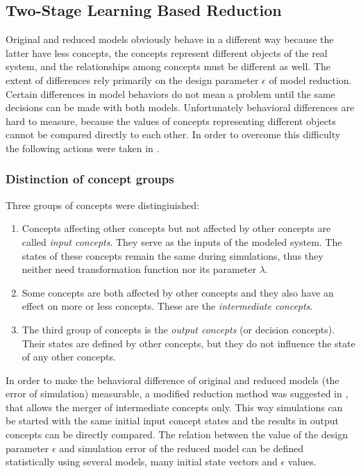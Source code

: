 \documentclass[graybox]{svmult}
\begin{document}
\subsection{Two-Stage Learning Based Reduction}
\label{sec:2stage}

Original and reduced models obviously behave in a different way 
because the latter have less concepts, the concepts 
represent different objects of the real system, and the 
relationships among concepts must be different as well. The extent 
of differences rely primarily on the design parameter $\epsilon$ of 
model reduction. Certain differences in model behaviors do not mean 
a problem until the same decisions can be made with both models. 
Unfortunately behavioral differences are hard to measure, because 
the values of concepts representing different objects cannot be 
compared directly to each other. In order to overcome this difficulty the 
following actions were taken in \cite{hatwagner2018two}.

\subsubsection{Distinction of concept groups}
\label{sec:conceptGroups}

Three groups of concepts were distingiuished: 
\begin{enumerate}
  \item Concepts affecting other concepts but not affected by other 
  concepts are called \emph{input concepts}. They serve as the inputs 
  of the modeled system. The states of these concepts remain the same 
  during simulations, thus they neither need transformation function 
  nor its parameter $\lambda$.
  \item Some concepts are both affected by other concepts and they 
  also have an effect on more or less concepts. These are the 
  \emph{intermediate concepts}.
  \item The third group of concepts is the \emph{output 
  concepts} (or decision concepts). Their states are defined by 
  other concepts, but they do not influence the state of any other 
  concepts. 
\end{enumerate} 
In order to make the behavioral difference of original and reduced 
models (the error of simulation) measurable, a modified reduction 
method was suggested in \cite{hatwagner2018two}, that allows the merger 
of intermediate concepts only. This way simulations can be started with 
the same initial input concept states and the results in output 
concepts can be directly compared. The relation between the value of 
the design parameter $\epsilon$ and simulation error of the reduced model 
can be defined statistically using several models, many initial state 
vectors and $\epsilon$ values.
\end{document}
